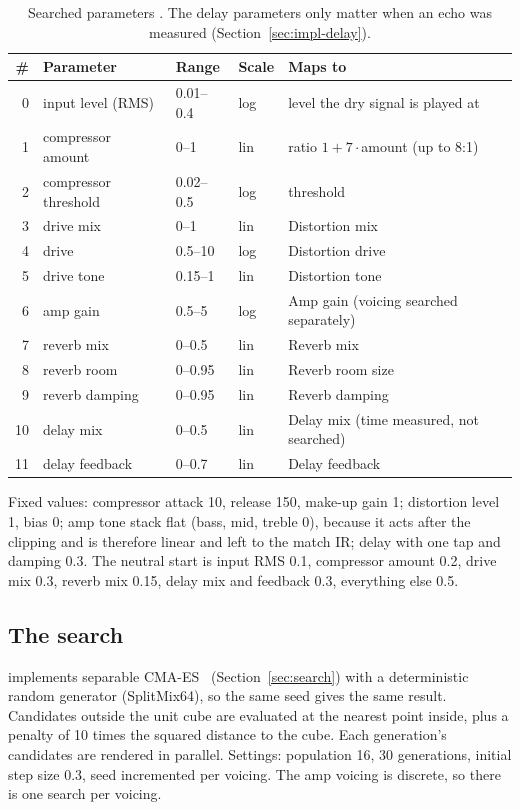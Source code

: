 \begin{table}[h]
\centering
\caption{Searched parameters \done. The delay parameters only matter when an
echo was measured (Section~\ref{sec:impl-delay}).}
\label{tab:template}
\small
\begin{tabular}{@{}rllll@{}}
\toprule
\# & Parameter & Range & Scale & Maps to \\
\midrule
0 & input level (RMS) & 0.01--0.4 & log & level the dry signal is played at \\
1 & compressor amount & 0--1 & lin & ratio $1 + 7\cdot$amount (up to 8:1) \\
2 & compressor threshold & 0.02--0.5 & log & threshold \\
3 & drive mix & 0--1 & lin & Distortion mix \\
4 & drive & 0.5--10 & log & Distortion drive \\
5 & drive tone & 0.15--1 & lin & Distortion tone \\
6 & amp gain & 0.5--5 & log & Amp gain (voicing searched separately) \\
7 & reverb mix & 0--0.5 & lin & Reverb mix \\
8 & reverb room & 0--0.95 & lin & Reverb room size \\
9 & reverb damping & 0--0.95 & lin & Reverb damping \\
10 & delay mix & 0--0.5 & lin & Delay mix (time measured, not searched) \\
11 & delay feedback & 0--0.7 & lin & Delay feedback \\
\bottomrule
\end{tabular}
\end{table}

Fixed values: compressor attack 10\ms, release 150\ms, make-up gain 1;
distortion level 1, bias 0; amp tone stack flat (bass, mid, treble 0), because
it acts after the clipping and is therefore linear and left to the match IR;
delay with one tap and damping 0.3. The neutral start is input RMS 0.1,
compressor amount 0.2, drive mix 0.3, reverb mix 0.15, delay mix and feedback 0.3,
everything else 0.5.

\subsection{The search}

 implements separable CMA-ES~\cite{ros2008sepcmaes}
(Section~\ref{sec:search}) with a deterministic random generator (SplitMix64), so
the same seed gives the same result. Candidates outside the unit cube are
evaluated at the nearest point inside, plus a penalty of 10 times the squared
distance to the cube. Each generation's candidates are rendered in parallel.
Settings: population 16, 30 generations, initial step size 0.3, seed
incremented per voicing. The amp voicing is discrete, so there is one search per
voicing.

